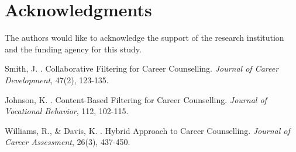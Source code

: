 \documentclass[12pt,a4paper]{article}
\begin{document}
\section*{Acknowledgments}
The authors would like to acknowledge the support of the research institution and the funding agency for this study.


\begin{thebibliography}{99}

Smith, J. . Collaborative Filtering for Career Counselling. \emph{Journal of Career Development}, 47(2), 123-135.

Johnson, K. . Content-Based Filtering for Career Counselling. \emph{Journal of Vocational Behavior}, 112, 102-115.

Williams, R., \& Davis, K. . Hybrid Approach to Career Counselling. \emph{Journal of Career Assessment}, 26(3), 437-450.

\end{thebibliography}
\end{document}
